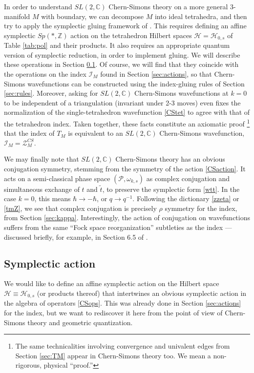 \documentclass[11pt,letterpaper]{article}
\numberwithin{equation}{section}
\newcommand{\Z}{{\mathbb Z}}
\newcommand{\C}{{\mathbb C}}
\newcommand{\CH}{\mathcal{H}}
\newcommand{\CI}{\mathcal{I}}
\newcommand{\CP}{\mathcal{P}}
\newcommand{\CZ}{\mathcal{Z}}
\begin{document}
In order to understand $SL(2,\C)$ Chern-Simons theory on a more general 3-manifold $M$ with boundary, we can decompose $M$ into ideal tetrahedra, and then try to apply the symplectic gluing framework of \cite{Dimofte-QRS}. This requires defining an affine symplectic $Sp(*,\Z)$ action on the tetrahedron Hilbert spaces $\CH = \CH_{0,s}$ of Table \ref{tab:pol} and their products. It also requires an appropriate quantum version of symplectic reduction, in order to implement gluing. We will describe these operations in Section \ref{sec:CSsymp}. Of course, we will find that they coincide with the operations on the index $\CI_M$ found in Section \ref{sec:actions}, so that Chern-Simons wavefunctions can be constructed using the index-gluing rules of Section \ref{sec:rules}. Moreover, asking for $SL(2,\C)$ Chern-Simons wavefunctions at $k=0$ to be independent of a triangulation (invariant under 2-3 moves) even fixes the normalization of the single-tetrahedron wavefunction \eqref{CStet} to agree with that of the tetrahedron index. Taken together, these facts constitute an axiomatic proof%
%
\footnote{The same technicalities involving convergence and univalent edges from Section \ref{sec:TM} appear in Chern-Simons theory too. We mean a non-rigorous, physical ``proof.''} %
%
that the index of $T_M$ is equivalent to an $SL(2,\C)$ Chern-Simons wavefunction, $\CI_M = \CZ_M^{CS}$.


We may finally note that $SL(2,\C)$ Chern-Simons theory has an obvious conjugation symmetry, stemming from the symmetry of the action \eqref{CSaction}. It acts on a semi-classical phase space $(\CP,\omega_{k,s})$ as complex conjugation and simultaneous exchange of $t$ and $\tilde t$, to preserve the symplectic form \eqref{wtt}. In the case $k=0$, this means $\hbar\to-\hbar$, or $q\to q^{-1}$. Following the dictionary \eqref{zzeta} or \eqref{tmZ}, we see that complex conjugation is precisely $\rho$ symmetry for the index, from Section \ref{sec:kappa}. Interestingly, the action of conjugation on wavefunctions suffers from the same ``Fock space reorganization'' subtleties as the index --- discussed briefly, for example, in Section 6.5 of \cite{Wfiveknots}.




\subsection{Symplectic action}
\label{sec:CSsymp}

We would like to define an affine symplectic action on the Hilbert space $\CH\equiv \CH_{0,s}$ (or products thereof) that intertwines an obvious symplectic action in the algebra of operators \eqref{CSops}. This was  already done in Section \ref{sec:actions} for the index, but we want to rediscover it here from the point of view of Chern-Simons theory and geometric quantization.
\end{document}
